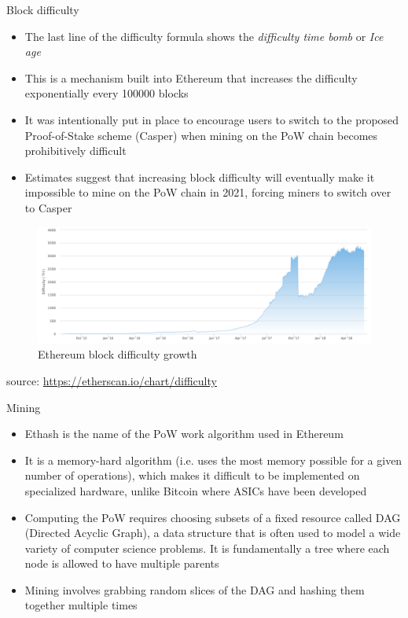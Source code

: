 \documentclass[11pt]{beamer}
\begin{document}
\begin{frame}{Block difficulty}
	\begin{itemize}
		\item The last line of the difficulty formula shows the \textit{difficulty time bomb} or \textit{Ice age}
		\item This is a mechanism built into Ethereum that increases the difficulty exponentially every 100000 blocks
		\item It was intentionally put in place to encourage users to switch to the proposed Proof-of-Stake scheme (Casper) when mining on the PoW chain becomes prohibitively difficult
		\item Estimates suggest that increasing block difficulty will eventually make it impossible to mine on the PoW chain in 2021, forcing miners to switch over to Casper
	\end{itemize}
\end{frame}


\begin{frame}
	\begin{figure}[]
		\centering
		\includegraphics  [scale=0.25]{Images/eth-difficulty}
		\caption{Ethereum block difficulty growth}
	\end{figure}
	\begin{scriptsize}
		source: \href{https://etherscan.io/chart/difficulty}{https://etherscan.io/chart/difficulty}
	\end{scriptsize}
\end{frame}


\begin{frame}{Mining}
	\begin{itemize}
		\item Ethash is the name of the PoW work algorithm used in Ethereum
		\item It is a memory-hard algorithm (i.e. uses the most memory possible for a given number of operations), which makes it difficult to be implemented on specialized hardware, unlike Bitcoin where ASICs have been developed
		\item Computing the PoW requires choosing subsets of a fixed resource called DAG (Directed Acyclic Graph), a data structure that is often used to model a wide variety of computer science problems. It is fundamentally a tree where each node is allowed to have multiple parents
		\item Mining involves grabbing random slices of the DAG and hashing them together multiple times
	\end{itemize}
\end{frame}
\end{document}
